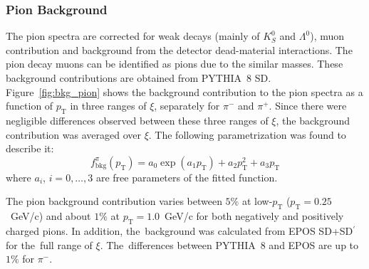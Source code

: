 \subsubsection{Pion Background}\label{section:star_background_pion}
The pion spectra are corrected for weak decays (mainly of $K^0_S$ and $\Lambda^0$), muon contribution and background from the   detector dead-material interactions. The pion decay muons can be identified as pions due to the similar masses. These background contributions are obtained from PYTHIA~8 \ac{SD}. Figure~\ref{fig:bkg_pion} shows the background contribution to the pion spectra as a function of $p_\textrm{T}$ in three ranges of $\xi$, separately for $\pi^-$ and $\pi^+$.  Since there were   negligible differences  observed between these  three ranges of $\xi$, the background contribution was averaged over $\xi$. The following parametrization was found to describe it:
\begin{equation}
f_{\textrm{bkg}}^{\pi}\left(p_\textrm{T}\right)=a_0\exp(a_1p_\textrm{T})+a_2p_\textrm{T}^2+a_3p_\textrm{T}
\end{equation}
where $a_i$, $i=0,\dots, 3$ are free parameters of the fitted function.



The pion background contribution varies between $5\%$ at low-$p_\textrm{T}$  ($p_\textrm{T}=0.25$~GeV/c) and about $1\%$ at $p_\textrm{T}=1.0$~GeV/c for both negatively and positively charged pions. In addition, the~background was calculated from EPOS SD+SD$^\prime$ for the~full range of $\xi$. The~differences between PYTHIA~8 and EPOS are up to $1\%$ for $\pi^-$. 


